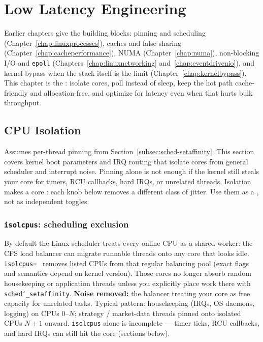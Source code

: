 \chapter{Low Latency Engineering}
\label{chap:lowlatency}

Earlier chapters give the building blocks: pinning and scheduling 
(Chapter~\ref{chap:linuxprocesses}), caches and false sharing 
(Chapter~\ref{chap:cacheperformance}), NUMA (Chapter~\ref{chap:numa}), 
non-blocking I/O and \texttt{epoll} (Chapters~\ref{chap:linuxnetworking} 
and~\ref{chap:eventdrivenio}), and kernel bypass when the stack itself is the limit 
(Chapter~\ref{chap:kernelbypass}). 
This chapter is the : isolate cores, poll instead of sleep, 
keep the hot path cache-friendly and allocation-free, and optimize for latency even when 
that hurts bulk throughput.

\section{CPU Isolation}
\label{sec:cpu-isolation}
Assumes per-thread pinning from Section~\ref{subsec:sched-setaffinity}. 
This section covers kernel boot parameters and IRQ routing that isolate cores 
from general scheduler and interrupt noise.
\newline
Pinning alone is not enough if the kernel still steals your core for timers, RCU callbacks, 
hard IRQs, or unrelated threads. Isolation makes a core : 
each knob below removes a different class of jitter. Use them as a , 
not as independent toggles.

\subsection{\texttt{isolcpus}: scheduling exclusion}
\label{subsec:isolcpus}
By default the Linux scheduler treats every online CPU as a shared worker: 
the CFS load balancer can migrate runnable threads onto any core that looks idle. 
\texttt{isolcpus=}~\cite{kernel-isolcpus} removes listed CPUs from that regular 
balancing pool (exact flags and semantics depend on kernel version). 
Those cores no longer absorb random housekeeping or application threads unless 
you explicitly place work there with \texttt{sched\char`_setaffinity}.
\newline
\textbf{Noise removed:} the balancer treating your core as free capacity for 
unrelated tasks.
\newline
Typical pattern: housekeeping (IRQs, OS daemons, logging) on CPUs 0--$N$; 
strategy / market-data threads pinned onto isolated CPUs $N{+}1$ onward. 
\texttt{isolcpus} alone is incomplete --- timer ticks, RCU callbacks, and hard 
IRQs can still hit the core (sections below).

